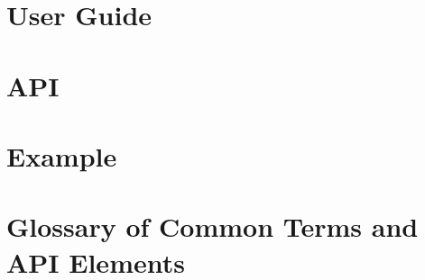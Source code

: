 \documentclass{book}
\begin{document}
\frontmatter
\maketitle
\tableofcontents

\mainmatter
\part{User Guide\label{User Guide}}



%
%

\part{API\label{API}}

\part{Example\label{Example}}


\part{Glossary of Common Terms and API Elements}
\end{document}
